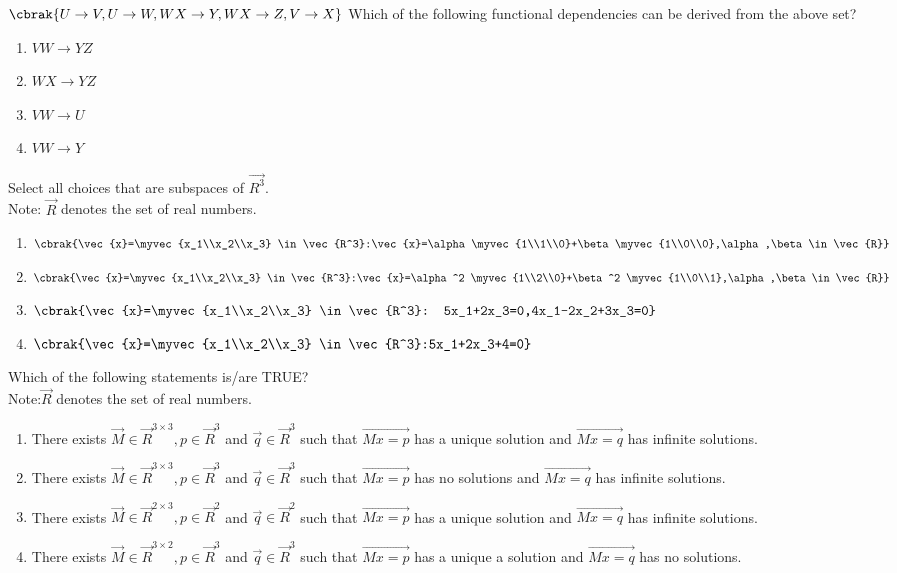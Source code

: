   $\cbrak{U\to V,U \to W, WX \to Y,WX \to Z,V \to X}$
  Which of the following functional dependencies can be derived from the above set?
  \begin{enumerate}
      \item $VW \to YZ$
      \item $WX \to YZ$
      \item $VW \to U$
      \item $VW \to Y$
  \end{enumerate}
  \item Select all choices that are subspaces of $\Vec{R^3}$.\\
  Note: $\vec{R}$ denotes the set of real numbers.
  \begin{enumerate}
      \item $\cbrak{\vec{x}=\myvec{x_1\\x_2\\x_3} \in \vec{R^3}:\vec{x}=\alpha \myvec{1\\1\\0}+\beta \myvec{1\\0\\0},\alpha,\beta \in \vec{R}}$
      \item  $\cbrak{\vec{x}=\myvec{x_1\\x_2\\x_3} \in \vec{R^3}:\vec{x}=\alpha^2 \myvec{1\\2\\0}+\beta^2 \myvec{1\\0\\1},\alpha,\beta \in \vec{R}}$
      \item  $\cbrak{\vec{x}=\myvec{x_1\\x_2\\x_3} \in \vec{R^3}: 5x_1+2x_3=0,4x_1-2x_2+3x_3=0}$
      \item  $\cbrak{\vec{x}=\myvec{x_1\\x_2\\x_3} \in \vec{R^3}:5x_1+2x_3+4=0}$
  \end{enumerate}
  \item Which of the following statements is/are TRUE?\\
  Note:$\vec{R}$ denotes the set of real numbers.
  \begin{enumerate}
      \item There exists $\vec{M}\in \vec{R}^{3\times3},p\in \vec{R}^{3}$ and $\vec{q} \in \vec{R}^3$ such that $\vec{Mx=p}$ has a unique solution and $\vec{Mx=q}$ has infinite solutions.
      \item There exists $\vec{M}\in \vec{R}^{3\times3},p\in \vec{R}^{3}$ and $\vec{q} \in \vec{R}^3$ such that $\vec{Mx=p}$ has no solutions and $\vec{Mx=q}$ has infinite solutions.
      \item There exists $\vec{M}\in \vec{R}^{2\times3},p\in \vec{R}^{2}$ and $\vec{q} \in \vec{R}^2$ such that $\vec{Mx=p}$ has a unique solution and $\vec{Mx=q}$ has infinite solutions.
      \item There exists $\vec{M}\in \vec{R}^{3\times2},p\in \vec{R}^{3}$ and $\vec{q} \in \vec{R}^3$ such that $\vec{Mx=p}$ has a unique a  solution and $\vec{Mx=q}$ has no solutions.
  \end{enumerate}
